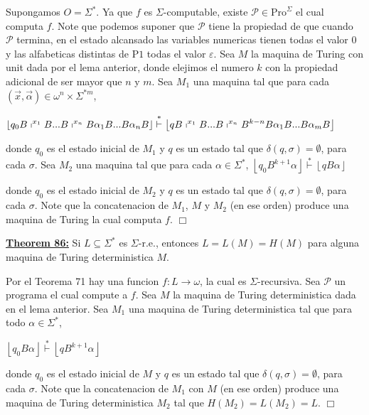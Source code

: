   \PROOF Supongamos $O=\Sigma ^{\ast }.$ Ya que $f$ es $\Sigma $-computable, existe $ \mathcal{P}\in \mathrm{Pro}^{\Sigma }$ el cual computa $f$. Note que podemos suponer que $\mathcal{P}$ tiene la propiedad de que cuando $\mathcal{P}$ termina, en el estado alcansado las variables numericas tienen todas el valor $0$ y las alfabeticas distintas de $\mathrm{P}1$ todas el valor $ \varepsilon $. Sea $M$ la maquina de Turing con unit dada por el lema anterior, donde elejimos el numero $k$ con la propiedad adicional de ser mayor que $n$ y $m$. Sea $M_{1}$ una maquina tal que para cada $(\vec{x}, \vec{\alpha})\in \omega ^{n}\times \Sigma ^{\ast m}$,

  $\displaystyle \left\lfloor q_{0}B\shortmid ^{x_{1}}B...B\shortmid ^{x_{n}}B\alpha _{1}B...B\alpha _{n}B\right\rfloor \overset{\ast }{\vdash }\left\lfloor qB\shortmid ^{x_{1}}B...B\shortmid ^{x_{n}}B^{k-n}B\alpha _{1}B...B\alpha _{m}B\right\rfloor $

  donde $q_{0}$ es el estado inicial de $M_{1}$ y $q$ es un estado tal que $ \delta (q,\sigma )=\emptyset $, para cada $\sigma .$ Sea $M_{2}$ una maquina tal que para cada $\alpha \in \Sigma ^{\ast }$,
  $\displaystyle \left\lfloor q_{0}B^{k+1}\alpha \right\rfloor \overset{\ast }{\vdash } \left\lfloor qB\alpha \right\rfloor $

  donde $q_{0}$ es el estado inicial de $M_{2}$ y $q$ es un estado tal que $ \delta (q,\sigma )=\emptyset $, para cada $\sigma $. Note que la concatenacion de $M_{1}$, $M$ y $M_{2}$ (en ese orden) produce una maquina de Turing la cual computa $f$. $\Box$



  \textbf{\underline{Theorem 86:}} Si $L\subseteq \Sigma ^{\ast }$ es $\Sigma $-r.e., entonces $L=L(M)=H(M)$ para alguna maquina de Turing deterministica $M.$


  \PROOF Por el Teorema 71 hay una funcion $f:L\rightarrow \omega $, la cual es $\Sigma $-recursiva$.$ Sea $\mathcal{P}$ un programa el cual compute a $f$. Sea $M$ la maquina de Turing deterministica dada en el lema anterior. Sea $M_{1}$ una maquina de Turing deterministica tal que para todo $\alpha \in \Sigma ^{\ast }$,

  $\displaystyle \left\lfloor q_{0}B\alpha \right\rfloor \overset{\ast }{\vdash }\left\lfloor qB^{k+1}\alpha \right\rfloor $

  donde $q_{0}$ es el estado inicial de $M$ y $q$ es un estado tal que $\delta (q,\sigma )=\emptyset $, para cada $\sigma $. Note que la concatenacion de $ M_{1}$ con $M$ (en ese orden) produce una maquina de Turing deterministica $ M_{2}$ tal que $H(M_{2})=L(M_{2})=L$. $\Box$
